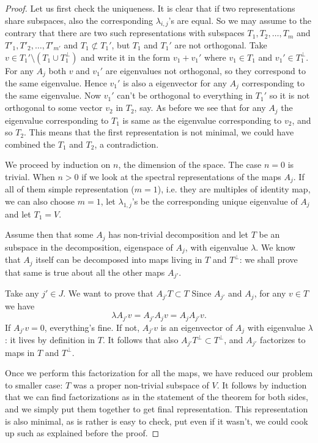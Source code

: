 \begin{proof}

	Let us first check the uniqueness. It is clear that if two representations share subspaces, also the corresponding $\lambda_{i, j}$'s are equal. So we may assume to the contrary that there are two such representations with subspaces $T_{1}, T_{2}, \ldots, T_{m}$ and $T'_{1}, T'_{2}, \ldots, T'_{m'}$ and $T_{1} \not\subset T_{1}'$, but $T_{1}$ and $T_{1}'$ are not orthogonal. Take $v \in T_{1}' \setminus (T_{1} \cup T_{1}^{\perp})$ and write it in the form $v_{1} + v_{1}'$ where $v_{1} \in T_{1}$ and $v_{1}' \in T_{1}^{\perp}$. For any $A_{j}$ both $v$ and $v_{1}'$ are eigenvalues not orthogonal, so they correspond to the same eigenvalue. Hence $v_{1}'$ is also a eigenvector for any $A_{j}$ corresponding to the same eigenvalue. Now $v_{1}'$ can't be orthogonal to everything in $T_{1}'$ so it is not orthogonal to some vector $v_{2}$ in $T_{2}$, say. As before we see that for any $A_{j}$ the eigenvalue corresponding to $T_{1}$ is same as the eigenvalue corresponding to $v_{2}$, and so $T_{2}$. This means that the first representation is not minimal, we could have combined the $T_{1}$ and $T_{2}$, a contradiction.
 
	We proceed by induction on $n$, the dimension of the space. The case $n = 0$ is trivial. When $n > 0$ if we look at the spectral representations of the maps $A_{j}$. If all of them simple representation ($m = 1$), i.e. they are multiples of identity map, we can also choose $m = 1$, let $\lambda_{1, j}$'s be the corresponding unique eigenvalue of $A_{j}$ and let $T_{1} = V$.

	Assume then that some $A_{j}$ has non-trivial decomposition and let $T$ be an subspace in the decomposition, eigenspace of $A_{j}$, with eigenvalue $\lambda$. We know that $A_{j}$ itself can be decomposed into maps living in $T$ and $T^{\perp}$: we shall prove that same is true about all the other maps $A_{j'}$.

	Take any $j' \in J$. We want to prove that $A_{j'} T \subset T$ Since $A_{j'}$ and $A_{j}$, for any $v \in T$ we have
	\[
		\lambda A_{j'} v = A_{j'} A_{j} v = A_{j} A_{j'} v.
	\]
	If $A_{j'} v = 0$, everything's fine. If not, $A_{j'}v$ is an eigenvector of $A_{j}$ with eigenvalue $\lambda$: it lives by definition in $T$. It follows that also $A_{j'} T^{\perp} \subset T^{\perp}$, and $A_{j'}$ factorizes to maps in $T$ and $T^{\perp}$.

	Once we perform this factorization for all the maps, we have reduced our problem to smaller case: $T$ was a proper non-trivial subspace of $V$. It follows by induction that we can find factorizations as in the statement of the theorem for both sides, and we simply put them together to get final representation. This representation is also minimal, as is rather is easy to check, put even if it wasn't, we could cook up such as explained before the proof.
\end{proof}

